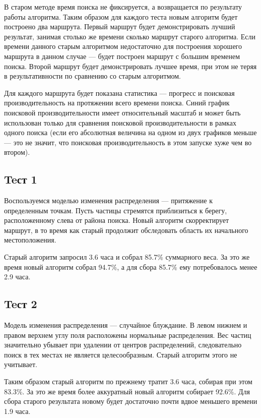 В старом методе время поиска не фиксируется, а возвращается по результату работы алгоритма.
Таким образом для каждого теста новым алгоритм будет построено два маршрута. Первый маршрут
будет демонстрировать лучший результат, занимая столько же времени сколько маршрут
старого алгоритма. Если времени данного старым алгоритмом недостаточно для построения
хорошего маршрута в данном случае --- будет построен маршрут с большим временем поиска.
Второй маршрут будет демонстрировать лучшее время, при этом не теряя в результативности
по сравнению со старым алгоритмом.

Для каждого маршрута будет показана статистика --- прогресс и поисковая производительность
на протяжении всего времени поиска. Синий график поисковой производительности имеет
относительный масштаб и может быть использован только для сравнения поисковой производительности
в рамках одного поиска (если его абсолютная величина на одном из двух графиков меньше --- это
не значит, что поисковая производительность в этом запуске хуже чем во втором).
\subsection{Teст 1}

Воспользуемся моделью изменения распределения --- притяжение к определенным точкам. Пусть
частицы стремятся приблизиться к берегу, расположенному слева от района поиска. Новый алгоритм
скорректирует маршрут, в то время как старый продолжит обследовать область их начального
местоположения.

 Старый алгоритм запросил 3.6 часа и собрал 85.7\% суммарного веса.
За это же время новый алгоритм собрал 94.7\%, а для сбора 85.7\% ему потребовалось
менее 2.9 часа.

\subsection{Teст 2}
Модель изменения распределения --- случайное блуждание. В левом нижнем и правом верхнем
углу поля расположены нормальные распределения. Вес частиц значительно убывает при удалении
от центров распределений, следовательно поиск в тех местах не является целесообразным.
Старый алгоритм этого не учитывает.

Таким образом старый алгоритм по прежнему тратит 3.6 часа, собирая при этом 83.3\%.
За это же время более аккуратный новый алгоритм собирает 92.6\%. Для сбора старого
результата новому будет достаточно почти вдвое меньшего времени 1.9 часа.

